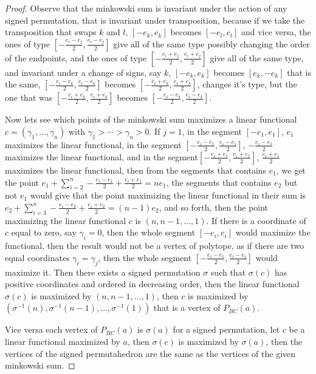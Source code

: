 \documentclass[12pt]{amsart}
\numberwithin{equation}{section}
\begin{document}
\begin{proof}
Observe that the minkowski sum is invariant under the action of any signed permutation, that is invariant under transposition, because if we take the transposition that swaps $k$ and $l$, $[ -e_k,e_k ]$ becomes $[ -e_l,e_l ]$ and vice versa, the ones of type $[-\frac{e_i-e_j}{2},\frac{e_i-e_j}{2}]$ give all of the same type possibly changing the order of the endpoints, and the ones of type $[-\frac{e_i+e_j}{2},\frac{e_i+e_j}{2}]$ give all of the same type, and invariant under a change of signs, say $k$, $[ -e_k,e_k ]$ becomes $[ e_k,-e_k ]$ that is the same, $[-\frac{e_i-e_k}{2},\frac{e_i-e_k}{2}]$ becomes $[-\frac{e_i+e_k}{2},\frac{e_i+e_k}{2}]$, changes it's type, but the one that was $[-\frac{e_i+e_k}{2},\frac{e_i+e_k}{2}]$ becomes $[-\frac{e_i-e_k}{2},\frac{e_i-e_k}{2}]$.

Now lets see which points of the minkowski sum maximizes a linear functional $c=(\gamma_1,\dots,\gamma_n)$ with $\gamma_1>\cdots>\gamma_n> 0$. If $j=1$, in the segment $[ -e_1,e_1 ]$, $e_1$ maximizes the linear functional, in the segment $[-\frac{e_i-e_1}{2},\frac{e_i-e_1}{2}]$, $-\frac{e_i-e_1}{2}$ maximizes the linear functional, and in the segment$[-\frac{e_i+e_1}{2},\frac{e_i+e_1}{2}]$, $\frac{e_i+e_1}{2}$ maximizes the linear functional, then from the segments that contains $e_1$, we get the point $e_1+\sum_{i=2}^n -\frac{e_i-e_1}{2}+\frac{e_i+e_1}{2}=ne_1$, the segments that contains $e_2$ but not $e_1$ would give that the point maximizing the linear functional in their sum is $e_2+\sum_{i=3}^n -\frac{e_i-e_2}{2}+\frac{e_i+e_2}{2}=(n-1)e_2$, and so forth, then the point maximizing the linear functional $c$ is $(n,n-1,\dots,1)$. If there is a coordinate of $c$ equal to zero, say $\gamma_i=0$, then the whole segment $[ -e_i,e_i ]$ would maximize the functional, then the result would not be a vertex of polytope, as if there are two equal coordinates $\gamma_i=\gamma_j$, then the whole segment $[-\frac{e_i-e_1}{2},\frac{e_i-e_1}{2}]$ would maximize it. Then there exists a signed permutation $\sigma$ such that $\sigma(c)$ has positive coordinates and ordered in decreasing order, then the linear functional $\sigma(c)$ is maximized by $(n,n-1,\dots,1)$, then $c$ is maximized by $(\sigma^{-1}(n),\sigma^{-1}(n-1),\dots,\sigma^{-1}(1))$ that is a vertex of $P_{BC}(a)$.

Vice versa each vertex of $P_{BC}(a)$ is $\sigma(a)$ for a signed permutation, let $c$ be a linear functional maximized by $a$, then $\sigma(c)$ is maximized by $\sigma(a)$, then the vertices of the signed permutahedron are the same as the vertices of the given minkowski sum.
\end{proof}
\end{document}
